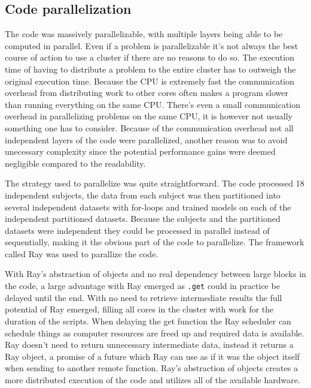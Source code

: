 \documentclass[12pt, a4paper]{article}
\begin{document}
\subsection{Code parallelization}
The code was massively parallelizable, with multiple layers being able to be computed in parallel.
Even if a problem is parallelizable it's not always the best course of action to use a cluster if there are no reasons to do so.
The execution time of having to distribute a problem to the entire cluster has to outweigh the original execution time.
Because the CPU is extremely fast the communication overhead from distributing work to other cores often makes a program slower than running everything on the same CPU.
There's even a small communication overhead in parallelizing problems on the same CPU, it is however not usually something one has to consider.
Because of the communication overhead not all independent layers of the code were parallelized, another reason was to avoid unecessary complexity since the potential performance gains were deemed negligible compared to the readability.

The strategy used to parallelize was quite straightforward. 
The code processed 18 independent subjects, the data from each subject was then partitioned into several independent datasets with for-loops and trained models on each of the independent partitioned datasets. 
Because the subjects and the partitioned datasets were independent they could be processed in parallel instead of sequentially, making it the obvious part of the code to parallelize.
The framework called Ray was used to parallize the code. 

With Ray's abstraction of objects and no real dependency between large blocks in the code, a large advantage with Ray emerged as \texttt{.get} could in practice be delayed until the end.
With no need to retrieve intermediate results the full potential of Ray emerged, filling all cores in the cluster with work for the duration of the scripts.
When delaying the get function the Ray scheduler can schedule things as computer resources are freed up and required data is available.
Ray doesn't need to return unnecessary intermediate data, instead it returns a Ray object, a promise of a future which Ray can use as if it was the object itself when sending to another remote function.
Ray's abstraction of objects creates a more distributed execution of the code and utilizes all of the available hardware.
\end{document}
